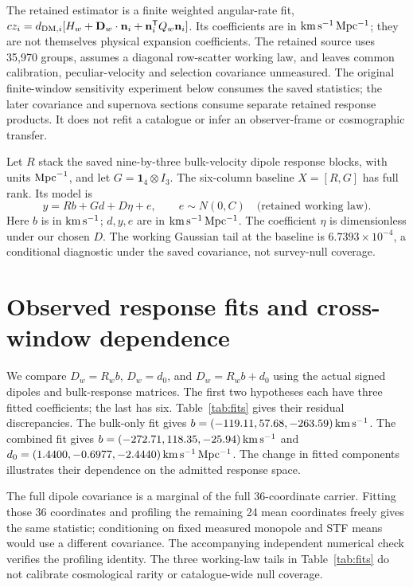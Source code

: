 \documentclass[aps,prd,reprint,onecolumn,superscriptaddress,nofootinbib]{revtex4-2}
\begin{document}
The retained estimator is a finite weighted angular-rate fit, $cz_i=d_{{\rm DM},i}[H_w+\mathbf D_w\cdot\mathbf n_i+\mathbf n_i^{\mathsf T}Q_w\mathbf n_i]$. Its coefficients are in ${\rm km\,s^{-1}\,Mpc^{-1}}$; they are not themselves physical expansion coefficients. The retained source uses 35,970 groups, assumes a diagonal row-scatter working law, and leaves common calibration, peculiar-velocity and selection covariance unmeasured. The original finite-window sensitivity experiment below consumes the saved statistics; the later covariance and supernova sections consume separate retained response products. It does not refit a catalogue or infer an observer-frame or cosmographic transfer.

Let $R$ stack the saved nine-by-three bulk-velocity dipole response blocks, with units ${\rm Mpc}^{-1}$, and let $G=\mathbf 1_4\otimes I_3$. The six-column baseline $X=[R,G]$ has full rank. Its model is
\begin{equation}
 y=Rb+Gd+D\eta+e,\qquad e\sim N(0,C)\quad\text{(retained working law)}.
 \label{eq:model}
\end{equation}
Here $b$ is in ${\rm km\,s^{-1}}$; $d,y,e$ are in ${\rm km\,s^{-1}\,Mpc^{-1}}$. The coefficient $\eta$ is dimensionless under our chosen $D$. The working Gaussian tail at the baseline is $6.7393\times10^{-4}$, a conditional diagnostic under the saved covariance, not survey-null coverage.

\section{Observed response fits and cross-window dependence}

We compare $D_w=R_wb$, $D_w=d_0$, and $D_w=R_wb+d_0$ using the actual signed dipoles and bulk-response matrices. The first two hypotheses each have three fitted coefficients; the last has six. Table~\ref{tab:fits} gives their residual discrepancies. The bulk-only fit gives $b=(-119.11,57.68,-263.59)\,{\rm km\,s^{-1}}$. The combined fit gives $b=(-272.71,118.35,-25.94)\,{\rm km\,s^{-1}}$ and $d_0=(1.4400,-0.6977,-2.4440)\,{\rm km\,s^{-1}\,Mpc^{-1}}$. The change in fitted components illustrates their dependence on the admitted response space.

The full dipole covariance is a marginal of the full 36-coordinate carrier. Fitting those 36 coordinates and profiling the remaining 24 mean coordinates freely gives the same statistic; conditioning on fixed measured monopole and STF means would use a different covariance. The accompanying independent numerical check verifies the profiling identity. The three working-law tails in Table~\ref{tab:fits} do not calibrate cosmological rarity or catalogue-wide null coverage.
\end{document}
